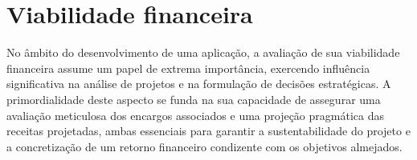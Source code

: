 \chapter{Viabilidade financeira}

No âmbito do desenvolvimento de uma aplicação, a avaliação de sua viabilidade financeira assume um papel de extrema importância, exercendo influência significativa na análise de projetos e na formulação de decisões estratégicas. A primordialidade deste aspecto se funda na sua capacidade de assegurar uma avaliação meticulosa dos encargos associados e uma projeção pragmática das receitas projetadas, ambas essenciais para garantir a sustentabilidade do projeto e a concretização de um retorno financeiro condizente com os objetivos almejados.







